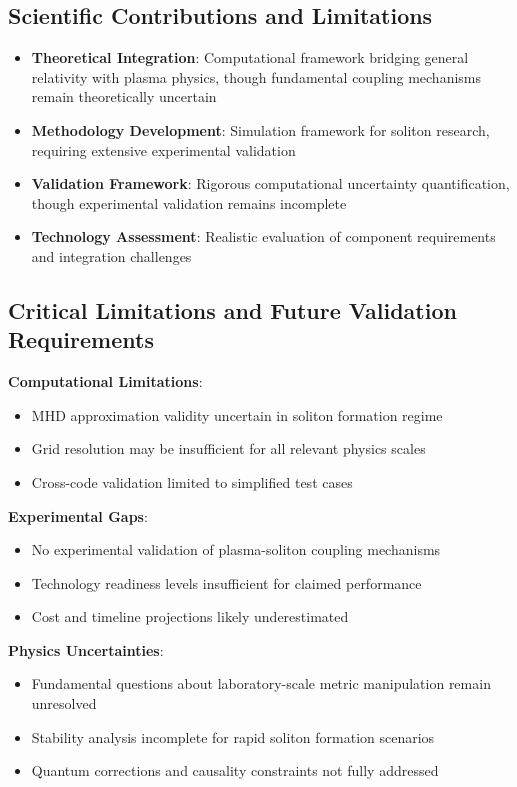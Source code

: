 \documentclass[12pt,a4paper]{article}
\begin{document}
\subsection{Scientific Contributions and Limitations}
\begin{itemize}
\item \textbf{Theoretical Integration}: Computational framework bridging general relativity with plasma physics, though fundamental coupling mechanisms remain theoretically uncertain
\item \textbf{Methodology Development}: Simulation framework for soliton research, requiring extensive experimental validation
\item \textbf{Validation Framework}: Rigorous computational uncertainty quantification, though experimental validation remains incomplete
\item \textbf{Technology Assessment}: Realistic evaluation of component requirements and integration challenges
\end{itemize}

\subsection{Critical Limitations and Future Validation Requirements}
\textbf{Computational Limitations}:
\begin{itemize}
\item MHD approximation validity uncertain in soliton formation regime
\item Grid resolution may be insufficient for all relevant physics scales  
\item Cross-code validation limited to simplified test cases
\end{itemize}

\textbf{Experimental Gaps}:
\begin{itemize}
\item No experimental validation of plasma-soliton coupling mechanisms
\item Technology readiness levels insufficient for claimed performance
\item Cost and timeline projections likely underestimated
\end{itemize}

\textbf{Physics Uncertainties}:
\begin{itemize}
\item Fundamental questions about laboratory-scale metric manipulation remain unresolved
\item Stability analysis incomplete for rapid soliton formation scenarios
\item Quantum corrections and causality constraints not fully addressed
\end{itemize}
\end{document}
